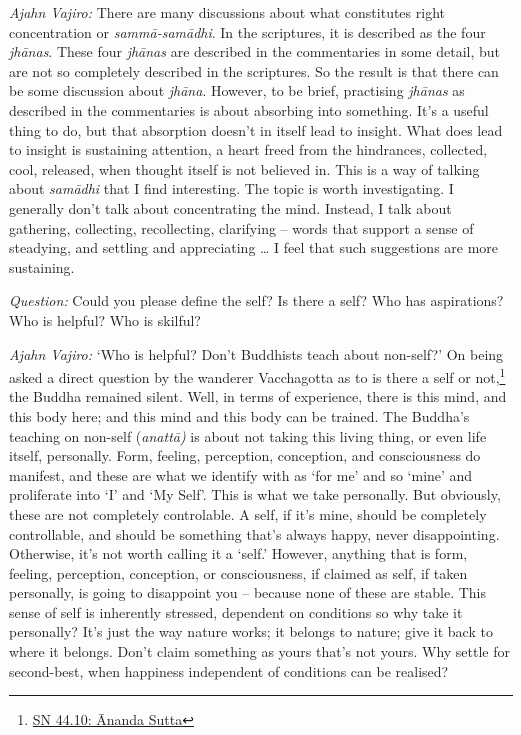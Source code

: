 \emph{Ajahn Vajiro:} There are many discussions about what constitutes right
concentration or \emph{sammā-samādhi}. In the scriptures, it is described as the
four \emph{jhānas}. These four \emph{jhānas} are described in the commentaries
in some detail, but are not so completely described in the scriptures. So the
result is that there can be some discussion about \emph{jhāna}. However, to be
brief, practising \emph{jhānas} as described in the commentaries is about
absorbing into something. It's a useful thing to do, but that absorption doesn't
in itself lead to insight. What does lead to insight is sustaining attention, a
heart freed from the hindrances, collected, cool, released, when thought itself
is not believed in. This is a way of talking about \emph{samādhi} that I find
interesting. The topic is worth investigating. I generally don't talk about
concentrating the mind. Instead, I talk about gathering, collecting,
recollecting, clarifying -- words that support a sense of steadying, and
settling and appreciating \ldots{} I feel that such suggestions are more
sustaining.

\bigskip

\emph{Question:} Could you please define the self? Is there a self? Who has
aspirations? Who is helpful? Who is skilful?

\emph{Ajahn Vajiro:} `Who is helpful? Don't Buddhists teach about non-self?' On being
asked a direct question by the wanderer Vacchagotta as to is there a self or not,\footnote{\href{https://suttacentral.net/sn44.10/en/bodhi}{SN 44.10: Ānanda Sutta}} the Buddha remained silent. Well, in terms of experience,
there is this mind, and this body here; and this mind and this body can be
trained. The Buddha's teaching on non-self (\emph{anattā)} is about not taking
this living thing, or even life itself, personally. Form, feeling, perception,
conception, and consciousness do manifest, and these are what we identify with
as `for me' and so `mine' and proliferate into `I' and `My Self'. This is what we take personally. But obviously, these
are not completely controlable. A self, if it's mine, should be completely
controllable, and should be something that's always happy, never disappointing.
Otherwise, it's not worth calling it a `self.' However, anything that is form,
feeling, perception, conception, or consciousness, if claimed as self, if taken
personally, is going to disappoint you -- because none of these are stable.
This sense of self is inherently stressed, dependent on conditions so why take it personally? It's just the way nature works; it belongs to nature; give it back
to where it belongs. Don't claim something as yours that's not yours. Why settle
for second-best, when happiness independent of conditions can be realised?

